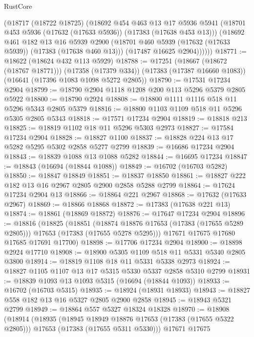 \begin{lexlean}{RustCore}
\begin{coremodule}
        (@18717
          (@18722 @18725)
          (@18692
            @454
            @463
            @13
            @17
            @5936
            @5941
            (@18701 @453 @5936 (@17632 (@17633 @5936)) (@17383 (@17638 @453 @13)))
            (@18692
              @461
              @182
              @13
              @16
              @5939
              @2900
              (@18701 @460 @5939 (@17632 (@17633 @5939)) (@17383 (@17638 @460 @13)))
              (@17487 @16625 @2904))))))
@18771 := @18622 (@18624 @432 @113 @5929)
@18788 := @17251
    (@18667 (@18672 (@18767 @18771)))
    (@17358 (@17379 @334))
    (@17383 (@17387 @16660 @1083))
    (@16641 (@17396 @1083 @1098 @5272 @2805))
@18790 := @17531 @17234 @2904
@18799 := @18790 @2904 @1118 @1208 @200 @113 @5296 @5379 @2805 @5922
@18800 := @18790 @2924
@18808 := @18800 @1111 @1116 @518 @11 @5296 @5343 @2805 @5379
@18816 := @18800 @1103 @1109 @518 @11 @5296 @5305 @2805 @5343
@18818 := @17571 @17234 @2904
@18819 := @18818 @213
@18825 := @18819 @1102 @18 @11 @5296 @5303 @2973
@18827 := @17584 @17234 @2904
@18828 := @18827 @1100
@18837 := @18828 @224 @13 @17 @5282 @5295 @5302 @2858 @5277 @2799
@18839 := @16686 @17234 @2904
@18843 := @18839 @1088 @13 @1088 @5282
@18844 := @16695 @17234
@18847 := @18843 (@16694 (@18844 @1088))
@18849 := @16702 (@16703 @5282)
@18850 := @18847 @18849
@18851 := @18837 @18850
@18861 := @18827 @222 @182 @13 @16 @2967 @2805 @2900 @2858 @5288 @2799
@18864 := @17624 @17234 @2904 @13
@18866 := @18864 @221 @2967
@18868 := @17632 (@17633 @2967)
@18869 := @18866 @18868
@18872 := @17383 (@17638 @221 @13)
@18874 := @18861 (@18869 @18872)
@18876 := @17647 @17234 @2904
@18896 := @18816
    (@18825
      (@18851
        (@18874 @18876 @17653 (@17383 (@17655 @5289 @2805)))
        @17653
        (@17383 (@17655 @5278 @5295)))
      @17671
      @17675
      @17680
      @17685
      @17691
      @17700)
@18898 := @17706 @17234 @2904
@18900 := @18898 @2924 @17710
@18908 := @18900 @5305 @1109 @518 @11 @5331 @5340 @2805 @3800
@18914 := @18819 @1108 @18 @11 @5331 @5338 @2973
@18924 := @18827 @1105 @1107 @13 @17 @5315 @5330 @5337 @2858 @5310 @2799
@18931 := @18839 @1093 @13 @1093 @5315 (@16694 (@18844 @1093))
@18933 := @16702 (@16703 @5315)
@18935 := @18924 (@18931 @18933)
@18943 := @18827 @558 @182 @13 @16 @5327 @2805 @2900 @2858
@18945 := @18943 @5321 @2799
@18949 := @18864 @557 @5327 @18324 @18328
@18970 := @18908
    (@18914
      (@18935
        (@18945 @18949 @18876 @17653 (@17383 (@17655 @5322 @2805)))
        @17653
        (@17383 (@17655 @5311 @5330)))
      @17671
      @17675

\end{coremodule}
\end{lexlean}
